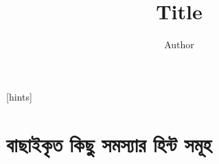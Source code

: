 \documentclass[statementpaper, 11pt, twoside, oldfontcommands]{memoir}
\title{\Huge\textbf{Title}}
\author{Author}
\date{}
\begin{document}
\mainmatter

% 
% 
% 

[hints]

\tableofcontents*









\part{বাছাইকৃত কিছু সমস্যার হিন্ট সমূহ}



% 
% 
\end{document}
